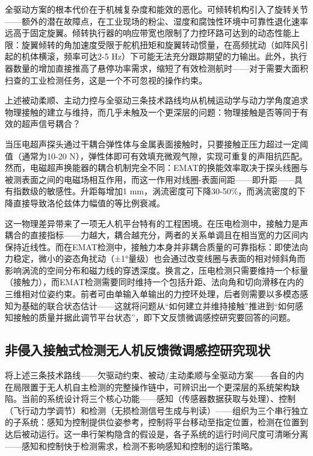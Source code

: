 全驱动方案的根本代价在于机械复杂度和能效的恶化。可倾转机构引入了旋转关节——额外的潜在故障点，在工业现场的粉尘、湿度和腐蚀性环境中可靠性退化速率远高于固定旋翼。倾转执行器的响应带宽也限制了力控环路可达到的动态性能上限：旋翼倾转的角加速度受限于舵机扭矩和旋翼转动惯量，在高频扰动（如阵风引起的机体横滚，频率可达2-5 Hz）下可能无法充分跟踪期望的力输出。此外，执行器数量的增加直接推高了悬停功率需求，缩短了有效检测航时——对于需要大面积扫查的工业检测任务，这是一个不可忽视的操作约束。

上述被动柔顺、主动力控与全驱动三条技术路线均从机械运动学与动力学角度追求物理接触的建立与维持，而几乎未触及一个更深层的问题：物理接触是否等同于有效的超声信号耦合？

当压电超声探头通过干耦合弹性体与金属表面接触时，只要接触正压力超过一定阈值（通常为10-20 N），弹性体即可有效填充微观气隙，实现可重复的声阻抗匹配。然而，电磁超声换能器的耦合机制完全不同：EMAT的换能效率取决于探头线圈与被测表面之间的电磁场相互作用，而这一作用对线圈-表面间距——即升距——具有指数级的敏感性。升距每增加1 mm，涡流密度可下降30-50\%，而涡流密度的下降直接导致洛伦兹体力幅值的等比例衰减。

这一物理差异带来了一项无人机平台特有的工程困境。在压电检测中，接触力是声耦合的直接指标——力越大，耦合越充分，两者的关系单调且在相当宽的力区间内保持近线性。而在EMAT检测中，接触力本身并非耦合质量的可靠指标：即使法向力稳定，微小的姿态角扰动（±1°量级）也会通过改变线圈与表面的相对倾斜角而影响涡流的空间分布和磁力线的穿透深度。换言之，压电检测只需要维持一个标量（接触力），而EMAT检测需要同时维持一个包括升距、法向角和切向滑移在内的三维相对位姿约束。前者可由单输入单输出的力控环处理，后者则需要以多模态感知为基础的联合状态估计——这就将问题从“如何建立并维持接触”推进到“如何感知接触的质量并据此调节平台状态”，即下文反馈微调感控研究要回答的问题。

\subsection{非侵入接触式检测无人机反馈微调感控研究现状}

将上述三条技术路线——欠驱动约束、被动/主动柔顺与全驱动方案——各自的内在局限置于无人机自主检测的完整操作链中，可辨识出一个更深层的系统架构缺陷。当前的系统设计将三个核心功能——感知（传感器数据获取与处理）、控制（飞行动力学调节）和检测（无损检测信号生成与判读）——组织为三个串行独立的子系统：感知为控制提供位姿参考，控制将平台移动至指定位置，检测在位置到达后被动运行。这一串行架构隐含的假设是，各子系统的运行时间尺度可清晰分离——感知和控制快于检测需求，检测不影响感知和控制的运行策略。

